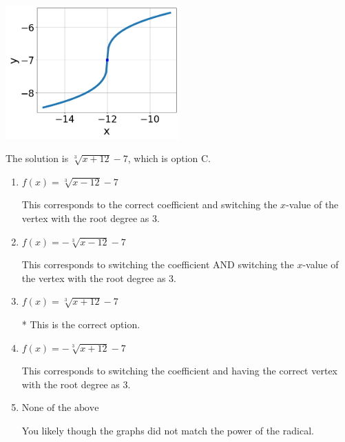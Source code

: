 \documentclass{extbook}[14pt]
\begin{document}
\begin{enumerate}
{\begin{center}
    \includegraphics[width=0.5\textwidth]{../Figures/radicalGraphToEquationC.png}
\end{center}


The solution is \( \sqrt[3]{x + 12} - 7 \), which is option C.\begin{enumerate}[label=\Alph*.]
\item \( f(x) = \sqrt[3]{x - 12} - 7 \)

This corresponds to the correct coefficient and switching the $x$-value of the vertex with the root degree as $3$.
\item \( f(x) = - \sqrt[3]{x - 12} - 7 \)

This corresponds to switching the coefficient AND switching the $x$-value of the vertex with the root degree as $3$.
\item \( f(x) = \sqrt[3]{x + 12} - 7 \)

* This is the correct option.
\item \( f(x) = - \sqrt[3]{x + 12} - 7 \)

This corresponds to switching the coefficient and having the correct vertex with the root degree as $3$.
\item \( \text{None of the above} \)

You likely though the graphs did not match the power of the radical.
\end{enumerate}

}
\end{enumerate}
\end{document}
